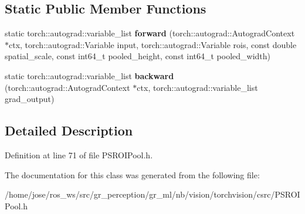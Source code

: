 \subsection*{Static Public Member Functions}
\begin{DoxyCompactItemize}
\item 
\mbox{\label{classPSROIPoolFunction_a85808e7fbf8dc4558fa41f57752f3dc6}} 
static torch\+::autograd\+::variable\+\_\+list {\bfseries forward} (torch\+::autograd\+::\+Autograd\+Context $\ast$ctx, torch\+::autograd\+::\+Variable input, torch\+::autograd\+::\+Variable rois, const double spatial\+\_\+scale, const int64\+\_\+t pooled\+\_\+height, const int64\+\_\+t pooled\+\_\+width)
\item 
\mbox{\label{classPSROIPoolFunction_a060a9e4f379b2b9dd98a1c480a4a1d0f}} 
static torch\+::autograd\+::variable\+\_\+list {\bfseries backward} (torch\+::autograd\+::\+Autograd\+Context $\ast$ctx, torch\+::autograd\+::variable\+\_\+list grad\+\_\+output)
\end{DoxyCompactItemize}


\subsection{Detailed Description}


Definition at line 71 of file P\+S\+R\+O\+I\+Pool.\+h.



The documentation for this class was generated from the following file\+:\begin{DoxyCompactItemize}
\item 
/home/jose/ros\+\_\+ws/src/gr\+\_\+perception/gr\+\_\+ml/nb/vision/torchvision/csrc/P\+S\+R\+O\+I\+Pool.\+h\end{DoxyCompactItemize}
